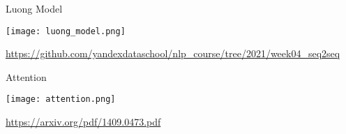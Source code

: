 \documentclass[notes,12pt, aspectratio=169]{beamer}
\begin{document}
\begin{frame}{Luong Model}
	\begin{center}
		\texttt{[image: luong\_model.png]}
	\end{center}
	\vfill
	\footnotesize  {\color{blue} \url{https://github.com/yandexdataschool/nlp_course/tree/2021/week04_seq2seq}} 
\end{frame} 



\begin{frame}{Attention}
	\begin{center}
		\texttt{[image: attention.png]}
	\end{center}
	\vfill
	\footnotesize  {\color{blue} \url{https://arxiv.org/pdf/1409.0473.pdf}} 
\end{frame} 
\end{document}
